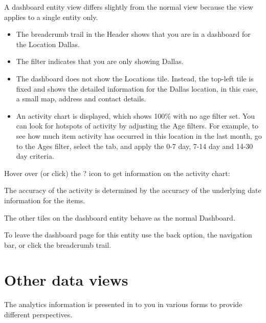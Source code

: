 \documentclass[letterpaper,10pt,english]{sphinxmanual}
\begin{document}
A dashboard entity view differs slightly from the normal  view because the view applies to a single entity only.
\begin{itemize}
\item {} 
The breadcrumb trail in the Header shows that you are in a dashboard for the Location Dallas.

\item {} 
The  filter indicates that you are only showing Dallas.

\item {} 
The dashboard does not show the Locations tile. Instead, the top-left tile is fixed and shows the detailed information for the Dallas location, in this case, a small map, address and contact details.

\item {} 
An activity chart is displayed, which shows 100\% with no age filter set. You can look for hotspots of activity by adjusting the Age filters. For example, to see how much item activity has occurred in this location in the last month, go to the Ages filter, select the  tab, and apply the 0-7 day, 7-14 day and 14-30 day criteria.

\end{itemize}

Hover over (or click) the ? icon to get information on the activity chart:
\begin{quote}

\begin{figure}[htbp]
\centering

\noindent{}
\end{figure}
\end{quote}

The accuracy of the activity is determined by the accuracy of the underlying date information for the items.

The other tiles on the dashboard entity behave as the normal Dashboard.

To leave the dashboard page for this entity use the back option, the navigation bar, or click the breadcrumb trail.


\section{Other data views}
\label{\detokenize{mcdmp_app_ug:other-data-views}}
The analytics information is presented in to you in various forms to provide different perspectives.
\end{document}
